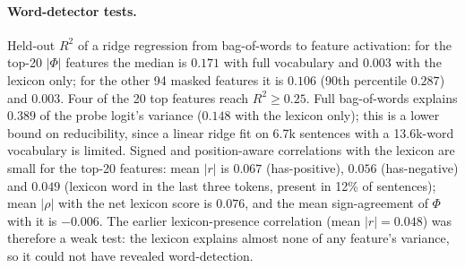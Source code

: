 \paragraph{Word-detector tests.} Held-out $R^2$ of a ridge regression from
bag-of-words to feature activation: for the top-20 $|\Phi|$ features the
median is $0.171$ with full vocabulary and $0.003$ with the lexicon only; for
the other 94 masked features it is $0.106$ (90th percentile $0.287$) and
$0.003$. Four of the 20 top features reach $R^2\ge0.25$. Full bag-of-words
explains $0.389$ of the probe logit's variance ($0.148$ with the lexicon only);
this is a lower bound on reducibility, since a linear ridge fit on 6.7k
sentences with a 13.6k-word vocabulary is limited. Signed and position-aware
correlations with the lexicon are small for the top-20 features: mean $|r|$ is
$0.067$ (has-positive), $0.056$ (has-negative) and $0.049$ (lexicon word in
the last three tokens, present in 12\% of sentences); mean $|\rho|$ with the
net lexicon score is $0.076$, and the mean sign-agreement of $\Phi$ with it is
$-0.006$. The earlier lexicon-presence correlation (mean $|r|=0.048$) was
therefore a weak test: the lexicon explains almost none of any feature's
variance, so it could not have revealed word-detection.

